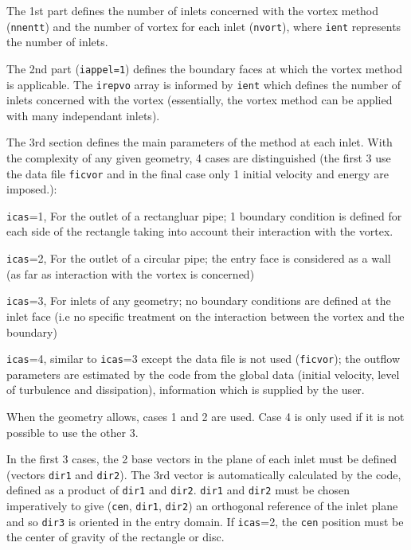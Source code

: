 {{{\begin{list}{-}{}
\item The 1st part defines the number of inlets concerned with the vortex
method (\texttt{nnentt}) and the number of vortex for each inlet
(\texttt{nvort}), where \texttt{ient} represents the number of inlets.
\item The 2nd part (\texttt{iappel=1}) defines the boundary faces at which the
      vortex method is applicable. The \texttt{irepvo} array is informed
      by \texttt{ient} which defines the number of inlets concerned with the vortex
(essentially, the vortex method can be applied with many independant inlets).
\item The 3rd section defines the main parameters of the method at each inlet.
      With the complexity of any given geometry, 4 cases are distinguished
      (the first 3 use the data file \texttt{ficvor} and in the final case only 1
      initial velocity and energy are imposed.):

\begin{list}{*}{}
\item \texttt{icas}=1, For the outlet of a rectangluar pipe; 1 boundary condition is defined
for each side of the rectangle taking into account their interaction
with the vortex.
\item \texttt{icas}=2, For the outlet of a circular pipe; the entry face is considered as a
 wall (as far as interaction with the vortex is concerned)
\item \texttt{icas}=3, For inlets of any geometry; no boundary conditions are defined at the
 inlet face (i.e no specific treatment on the interaction between the
 vortex and the boundary)
\item \texttt{icas}=4, similar to \texttt{icas}=3 except the data file is not
 used (\texttt{ficvor}); the outflow
 parameters are estimated by the code from the global data (initial
 velocity, level of turbulence and dissipation), information which is
 supplied by the user.
\end{list}

When the geometry allows, cases 1 and 2 are used. Case 4 is only used
 if it is not possible to use the other 3.

In the first 3 cases, the 2 base vectors in the plane of each inlet
must be defined (vectors \texttt{dir1} and \texttt{dir2}). The 3rd vector is
automatically calculated by the code, defined as a product of \texttt{dir1} and
\texttt{dir2}. \texttt{dir1} and \texttt{dir2} must be chosen imperatively to
give (\texttt{cen}, \texttt{dir1}, \texttt{dir2}) an orthogonal reference of the
inlet plane and so \texttt{dir3} is oriented in the entry domain. If
\texttt{icas}=2, the \texttt{cen} position must be the center of gravity of the
rectangle or disc.


\end{list}}}}
